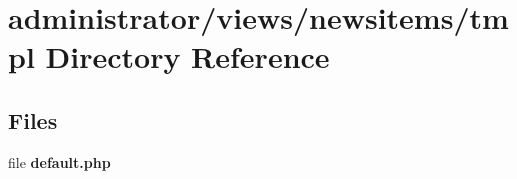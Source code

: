 \section{administrator/views/newsitems/tmpl Directory Reference}
\label{dir_a39ae0605130a3fda86982aae7d1cb84}
\subsection*{Files}
\begin{DoxyCompactItemize}
\item 
file \textbf{ default.\+php}
\end{DoxyCompactItemize}
